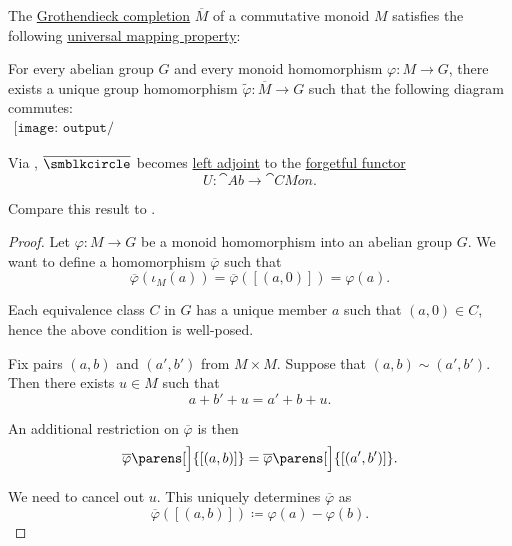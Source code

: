 \begin{proposition}\label{thm:monoid_grothendieck_completion_universal_property}
  The \hyperref[def:monoid_grothendieck_completion]{Grothendieck completion} \( \overline{M} \) of a commutative monoid \( M \) satisfies the following \hyperref[rem:universal_mapping_property]{universal mapping property}:
  \begin{displayquote}
    For every abelian group \( G \) and every monoid homomorphism \( \varphi: M \to G \), there exists a unique group homomorphism \( \widetilde{\varphi}: \overline{M} \to G \) such that the following diagram commutes:
    \begin{equation}\label{eq:thm:monoid_grothendieck_completion_universal_property/diagram}
      \begin{aligned}
        \texttt{[image: output/thm\_\_monoid\_grothendieck\_completion\_universal\_property.pdf]}
      \end{aligned}
    \end{equation}
  \end{displayquote}

  Via , \( \overline{\anon} \) becomes \hyperref[def:category_adjunction]{left adjoint} to the \hyperref[def:concrete_category]{forgetful functor}
  \begin{equation*}
    U: \cat{Ab} \to \cat{CMon}.
  \end{equation*}

  Compare this result to .
\end{proposition}
\begin{proof}
  Let \( \varphi: M \to G \) be a monoid homomorphism into an abelian group \( G \). We want to define a homomorphism \( \overline{\varphi} \) such that
  \begin{equation*}
    \overline{\varphi}(\iota_M(a)) = \overline{\varphi}([(a, 0)]) = \varphi(a).
  \end{equation*}

  Each equivalence class \( C \) in \( G \) has a unique member \( a \) such that \( (a, 0) \in C \), hence the above condition is well-posed.

  Fix pairs \( (a, b) \) and \( (a', b') \) from \( M \times M \). Suppose that \( (a, b) \sim (a', b') \). Then there exists \( u \in M \) such that
  \begin{equation*}
    a + b' + u = a' + b + u.
  \end{equation*}

  An additional restriction on \( \overline{\varphi} \) is then
  \begin{equation*}
    \overline{\varphi}\parens[\Big]{ [(a, b)] }
    =
    \overline{\varphi}\parens[\Big]{ [(a', b')] }.
  \end{equation*}

  We need to cancel out \( u \). This uniquely determines \( \overline{\varphi} \) as
  \begin{equation*}
    \overline{\varphi}([(a, b)]) \coloneqq \varphi(a) - \varphi(b).
  \end{equation*}
\end{proof}

